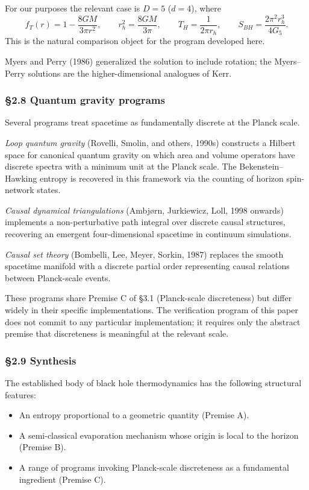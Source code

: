 \documentclass[a4paper,11pt]{article}
\theoremstyle{definition}
\providecommand{\tightlist}{\setlength{\itemsep}{0pt}\setlength{\parskip}{0pt}}
\begin{document}
For our purposes the relevant case is \(D = 5\) (\(d = 4\)), where
\[f_T(r) = 1 - \frac{8GM}{3\pi r^2}, \qquad r_h^2 = \frac{8GM}{3\pi}, \qquad T_H = \frac{1}{2\pi r_h}, \qquad S_{BH} = \frac{2\pi^2 r_h^3}{4 G_5}.\]
This is the natural comparison object for the program developed here.

Myers and Perry (1986) generalized the solution to include rotation; the
Myers--Perry solutions are the higher-dimensional analogues of Kerr.

\subsubsection{§2.8 Quantum gravity
programs}\label{quantum-gravity-programs}

Several programs treat spacetime as fundamentally discrete at the Planck
scale.

\emph{Loop quantum gravity} (Rovelli, Smolin, and others, 1990s)
constructs a Hilbert space for canonical quantum gravity on which area
and volume operators have discrete spectra with a minimum unit at the
Planck scale. The Bekenstein--Hawking entropy is recovered in this
framework via the counting of horizon spin-network states.

\emph{Causal dynamical triangulations} (Ambjørn, Jurkiewicz, Loll, 1998
onwards) implements a non-perturbative path integral over discrete
causal structures, recovering an emergent four-dimensional spacetime in
continuum simulations.

\emph{Causal set theory} (Bombelli, Lee, Meyer, Sorkin, 1987) replaces
the smooth spacetime manifold with a discrete partial order representing
causal relations between Planck-scale events.

These programs share Premise C of §3.1 (Planck-scale discreteness) but
differ widely in their specific implementations. The verification
program of this paper does not commit to any particular implementation;
it requires only the abstract premise that discreteness is meaningful at
the relevant scale.

\subsubsection{§2.9 Synthesis}\label{synthesis}

The established body of black hole thermodynamics has the following
structural features:

\begin{itemize}
\tightlist
\item
  An entropy proportional to a geometric quantity (Premise A).
\item
  A semi-classical evaporation mechanism whose origin is local to the
  horizon (Premise B).
\item
  A range of programs invoking Planck-scale discreteness as a
  fundamental ingredient (Premise C).
\end{itemize}
\end{document}
